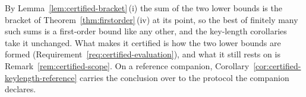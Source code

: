 
By Lemma~\ref{lem:certified-bracket}\,(i) the sum of the two lower bounds is
the bracket of Theorem~\ref{thm:firstorder}\,(iv) at its point, so the best
of finitely many such sums is a first-order bound like any other, and the
key-length corollaries take it unchanged. What makes it certified is how the
two lower bounds are formed (Requirement~\ref{req:certified-evaluation}),
and what it still rests on is Remark~\ref{rem:certified-scope}. On a
reference companion, Corollary~\ref{cor:certified-keylength-reference}
carries the conclusion over to the protocol the companion declares.

